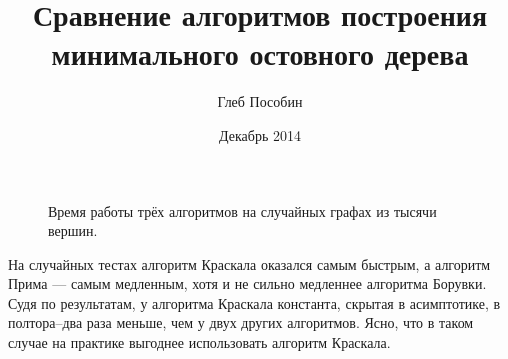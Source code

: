 \documentclass{article}
\title{Сравнение алгоритмов построения минимального остовного дерева}
\author{Глеб Пособин}
\date{Декабрь 2014}
\begin{document}
\maketitle

\begin{figure}[h!]
\centering

\caption{Время работы трёх алгоритмов на случайных графах из тысячи вершин.}
\label{fig:performance_plot}
\end{figure}

На случайных тестах алгоритм Краскала оказался самым быстрым, а алгоритм Прима --- самым медленным, хотя и не сильно медленнее алгоритма Борувки.
Судя по результатам, у алгоритма Краскала константа, скрытая в асимптотике, в полтора--два раза меньше, чем у двух других алгоритмов.
Ясно, что в таком случае на практике выгоднее использовать алгоритм Краскала.
\end{document}
